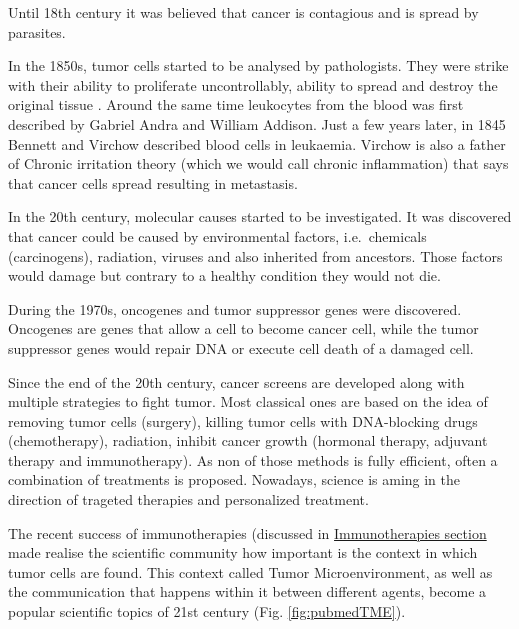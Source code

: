 \documentclass[12pt,]{book}
\theoremstyle{definition}
\theoremstyle{definition}
\theoremstyle{definition}
\theoremstyle{remark}
\begin{document}
Until 18th century it was believed that cancer is contagious and is
spread by parasites.

In the 1850s, tumor cells started to be analysed by pathologists. They
were strike with their ability to proliferate uncontrollably, ability to
spread and destroy the original tissue \citep{NPR2010}. Around the same
time leukocytes from the blood was first described by Gabriel Andra and
William Addison. Just a few years later, in 1845 Bennett and Virchow
described blood cells in leukaemia. Virchow is also a father of Chronic
irritation theory (which we would call chronic inflammation) that says
that cancer cells spread resulting in metastasis.

In the 20th century, molecular causes started to be investigated. It was
discovered that cancer could be caused by environmental factors,
i.e.~chemicals (carcinogens), radiation, viruses and also inherited from
ancestors. Those factors would damage but contrary to a healthy
condition they would not die.

During the 1970s, oncogenes and tumor suppressor genes were discovered.
Oncogenes are genes that allow a cell to become cancer cell, while the
tumor suppressor genes would repair DNA or execute cell death of a
damaged cell.

Since the end of the 20th century, cancer screens are developed along
with multiple strategies to fight tumor. Most classical ones are based
on the idea of removing tumor cells (surgery), killing tumor cells with
DNA-blocking drugs (chemotherapy), radiation, inhibit cancer growth
(hormonal therapy, adjuvant therapy and immunotherapy). As non of those
methods is fully efficient, often a combination of treatments is
proposed. Nowadays, science is aming in the direction of trageted
therapies and personalized treatment.

The recent success of immunotherapies (discussed in
\protect\hyperlink{immunotherapies}{Immunotherapies section} made
realise the scientific community how important is the context in which
tumor cells are found. This context called Tumor Microenvironment, as
well as the communication that happens within it between different
agents, become a popular scientific topics of 21st century (Fig.
\ref{fig:pubmedTME}).
\end{document}
